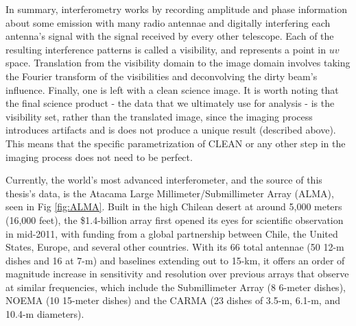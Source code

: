 
In summary, interferometry works by recording amplitude and phase information about some emission with many radio antennae and digitally interfering each antenna's signal with the signal received by every other telescope. Each of the resulting interference patterns is called a visibility, and represents a point in $uv$ space. Translation from the visibility domain to the image domain involves taking the Fourier transform of the visibilities and deconvolving the dirty beam's influence. Finally, one is left with a clean science image. It is worth noting that the final science product - the data that we ultimately use for analysis - is the visibility set, rather than the translated image, since the imaging process introduces artifacts and is does not produce a unique result (described above). This means that the specific parametrization of CLEAN or any other step in the imaging process does not need to be perfect.

Currently, the world's most advanced interferometer, and the source of this thesis's data, is the Atacama Large Millimeter/Submillimeter Array (ALMA), seen in Fig \ref{fig:ALMA}. Built in the high Chilean desert at around 5,000 meters (16,000 feet), the \$1.4-billion array first opened its eyes for scientific observation in mid-2011, with funding from a global partnership between Chile, the United States, Europe, and several other countries. With its 66 total antennae (50 12-m dishes and 16 at 7-m) and baselines extending out to 15-km, it offers an order of magnitude increase in sensitivity and resolution over previous arrays that observe at similar frequencies, which include the Submillimeter Array (8 6-meter dishes), NOEMA (10 15-meter dishes) and the CARMA (23 dishes of 3.5-m, 6.1-m, and 10.4-m diameters).

\begin{figure}[htp]
  \hspace*{\fill}%
  \hfill%
  \hspace*{\fill}%
\end{figure}


